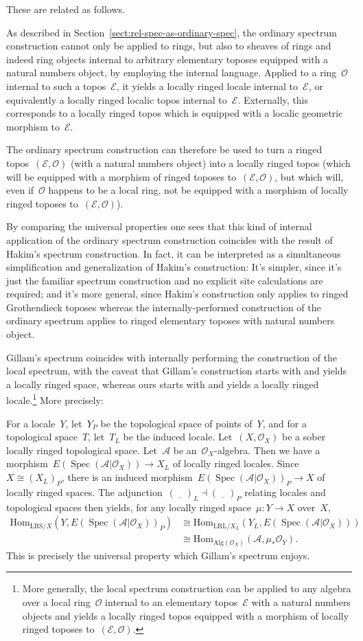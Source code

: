 \documentclass[10pt,reqno,a4paper]{amsbook}
\theoremstyle{definition}
\theoremstyle{plain}
\theoremstyle{remark}
\newcommand{\A}{\mathcal{A}}
\newcommand{\E}{\mathcal{E}}
\renewcommand{\O}{\mathcal{O}}
\newcommand{\Hom}{\mathrm{Hom}}
\newcommand{\placeholder}{\underline{\quad}}
\newcommand{\Alg}{\mathrm{Alg}}
\newcommand{\LRL}{\mathrm{LRL}}
\newcommand{\LRS}{\mathrm{LRS}}
\DeclareMathOperator{\Spec}{Spec}
\newcommand{\?}{\,{:}\,}
\renewcommand{\_}{\mathpunct{.}\,}
\begin{document}
These are related as follows.

As described in Section~\ref{sect:rel-spec-as-ordinary-spec}, the ordinary
spectrum construction cannot only be applied to rings, but also to sheaves of
rings and indeed ring objects internal to arbitrary elementary toposes equipped
with a natural numbers object, by employing the internal language. Applied to a
ring~$\O$ internal to such a topos~$\E$, it yields a locally ringed locale
internal to~$\E$, or equivalently a locally ringed localic topos internal
to~$\E$.  Externally, this corresponds to a locally ringed topos which is
equipped with a localic geometric morphism to~$\E$.

The ordinary spectrum construction can therefore be used to turn a ringed
topos~$(\E,\O)$ (with a natural numbers object) into a locally ringed topos
(which will be equipped with a morphism of ringed toposes to~$(\E,\O)$, but
which will, even if~$\O$ happens to be a local ring, not be equipped with a
morphism of locally ringed toposes to~$(\E,\O)$).

By comparing the universal properties one sees that this kind of internal
application of the ordinary spectrum construction coincides with the result of
Hakim's spectrum construction. In fact, it can be interpreted as a simultaneous
simplification and generalization of Hakim's construction: It's simpler, since
it's just the familiar spectrum construction and no explicit site calculations
are required; and it's more general, since Hakim's construction only applies to
ringed Grothendieck toposes whereas the internally-performed construction of
the ordinary spectrum applies to ringed elementary toposes with natural numbers
object.

Gillam's spectrum coincides with internally performing the construction of the
local spectrum, with the caveat that Gillam's construction starts with and
yields a locally ringed space, whereas ours starts with and yields a locally
ringed locale.\footnote{More generally, the local spectrum construction can be
applied to any algebra over a local ring~$\O$ internal to an elementary
topos~$\E$ with a natural numbers objects and yields a locally ringed topos
equipped with a morphism of locally ringed toposes to~$(\E,\O)$.} More
precisely:

For a locale~$Y$, let~$Y_P$ be the topological space of points of~$Y$, and for
a topological space~$T$, let~$T_L$ be the induced locale.  Let~$(X,\O_X)$ be a
sober locally ringed topological space. Let~$\A$ be an~$\O_X$-algebra. Then we
have a morphism~$E(\Spec(\A|\O_X)) \to X_L$ of locally ringed locales.
Since~$X \cong (X_L)_P$, there is an induced morphism~$E(\Spec(\A|\O_X))_P \to X$ of
locally ringed spaces. The adjunction~$(\placeholder)_L \dashv
(\placeholder)_P$ relating locales and topological spaces then yields, for any
locally ringed space~$\mu : Y \to X$ over~$X$,
\begin{align*}
  \Hom_{\LRS/X}(Y, E(\Spec(\A|\O_X))_P) &\cong
  \Hom_{\LRL/X_L}(Y_L, E(\Spec(\A|\O_X))) \\
  &\cong \Hom_{\Alg(\O_X)}(\A, \mu_*\O_Y).
\end{align*}
This is precisely the universal property which Gillam's spectrum enjoys.
\end{document}
